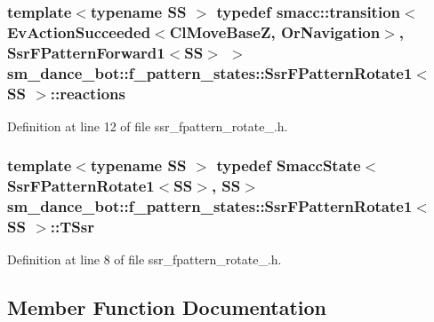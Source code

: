 \subsubsection[{\texorpdfstring{reactions}{reactions}}]{\setlength{\rightskip}{0pt plus 5cm}template$<$typename SS $>$ typedef {\bf smacc\+::transition}$<$Ev\+Action\+Succeeded$<${\bf Cl\+Move\+BaseZ}, {\bf Or\+Navigation}$>$, {\bf Ssr\+F\+Pattern\+Forward1}$<$SS$>$ $>$ {\bf sm\+\_\+dance\+\_\+bot\+::f\+\_\+pattern\+\_\+states\+::\+Ssr\+F\+Pattern\+Rotate1}$<$ SS $>$\+::{\bf reactions}}\hypertarget{structsm__dance__bot_1_1f__pattern__states_1_1SsrFPatternRotate1_a1d2c755267089ae9d9f1bc6ea6e64aa0}{}\label{structsm__dance__bot_1_1f__pattern__states_1_1SsrFPatternRotate1_a1d2c755267089ae9d9f1bc6ea6e64aa0}


Definition at line 12 of file ssr\+\_\+fpattern\+\_\+rotate\+\_.\+h.

\subsubsection[{\texorpdfstring{T\+Ssr}{TSsr}}]{\setlength{\rightskip}{0pt plus 5cm}template$<$typename SS $>$ typedef {\bf Smacc\+State}$<${\bf Ssr\+F\+Pattern\+Rotate1}$<$SS$>$, SS$>$ {\bf sm\+\_\+dance\+\_\+bot\+::f\+\_\+pattern\+\_\+states\+::\+Ssr\+F\+Pattern\+Rotate1}$<$ SS $>$\+::{\bf T\+Ssr}}\hypertarget{structsm__dance__bot_1_1f__pattern__states_1_1SsrFPatternRotate1_a41bb1cc142d247da6d99126c34f768bb}{}\label{structsm__dance__bot_1_1f__pattern__states_1_1SsrFPatternRotate1_a41bb1cc142d247da6d99126c34f768bb}


Definition at line 8 of file ssr\+\_\+fpattern\+\_\+rotate\+\_.\+h.



\subsection{Member Function Documentation}
